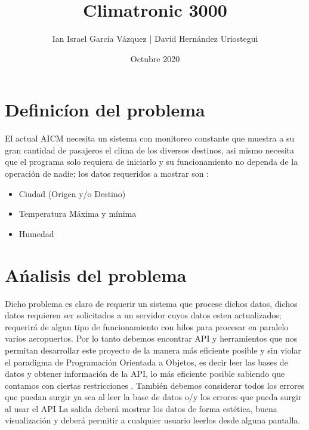 \documentclass{article}
\title{Climatronic 3000}
\author{Ian Israel García Vázquez | David Hernández Uriostegui}
\date{Octubre 2020}
\begin{document}
\maketitle


\section{Definicíon del problema}
El actual AICM necesita un sistema con monitoreo constante que muestra a su gran cantidad de pasajeros el clima de los diversos destinos, asi mismo necesita que el programa solo requiera de iniciarlo y su funcionamiento no dependa de la operación de nadie; los datos requeridos a mostrar son :
    \begin{itemize}
        \item Ciudad (Origen y/o Destino)
        \item Temperatura Máxima y mínima
        \item Humedad
    \end{itemize}
    
\section{Ańalisis del problema}
Dicho problema es claro de requerir un sistema  que procese dichos datos, dichos datos requieren ser solicitados a un servidor cuyos datos esten actualizados; requerirá de algun tipo de funcionamiento con hilos para procesar en paralelo varios aeropuertos.\newline
Por lo tanto debemos encontrar API y herramientos que nos permitan desarrollar este proyecto de la manera más eficiente posible y sin violar el paradigma de Programación Orientada a Objetos, es decir leer las bases de datos y obtener información de la API, lo más eficiente posible sabiendo que contamos con ciertas restricciones .\newline
También debemos considerar todos los errores que puedan surgir ya sea al leer la base de datos o/y los errores que pueda surgir al usar el API
La salida deberá mostrar los datos de forma estética, buena visualización y deberá permitir a cualquier usuario leerlos desde alguna pantalla.
\end{document}

